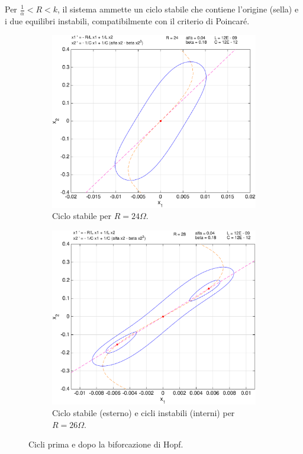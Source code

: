 \begin{enumerate}
Per $\frac{1}{\alpha} < R < k$, il sistema ammette un ciclo stabile che contiene l'origine (sella) e i due equilibri instabili, compatibilmente con il criterio di Poincaré.


\begin{figure}
\centering
    \begin{subfigure}{0.8\textwidth}
            \includegraphics[width=\textwidth]{pplane/Cycle24ohm}
            \caption{Ciclo stabile per $R = 24 \Omega$.}
    \end{subfigure}
    \par\bigskip
    \begin{subfigure}{0.8\textwidth}
            \includegraphics[width=\textwidth]{pplane/Cycle26ohm}
            \caption{Ciclo stabile (esterno) e cicli instabili (interni) per $R = 26 \Omega$.}
            \label{fig:hopf}
    \end{subfigure}
    \caption{Cicli prima e dopo la biforcazione di Hopf.}
    \label{fig:cicli-hopf}
\end{figure}


\end{enumerate}

